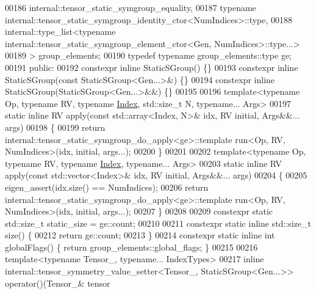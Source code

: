 \begin{DoxyCode}
00186       internal::tensor\_static\_symgroup\_equality,
00187       \textcolor{keyword}{typename} internal::tensor\_static\_symgroup\_identity\_ctor<NumIndices>::type,
00188       internal::type\_list<typename internal::tensor\_static\_symgroup\_element\_ctor<Gen, NumIndices>::type...>
00189     > group\_elements;
00190     \textcolor{keyword}{typedef} \textcolor{keyword}{typename} group\_elements::type ge;
00191   \textcolor{keyword}{public}:
00192     constexpr \textcolor{keyword}{inline} StaticSGroup() \{\}
00193     constexpr \textcolor{keyword}{inline} StaticSGroup(\textcolor{keyword}{const} StaticSGroup<Gen...>&) \{\}
00194     constexpr \textcolor{keyword}{inline} StaticSGroup(StaticSGroup<Gen...>&&) \{\}
00195 
00196     \textcolor{keyword}{template}<\textcolor{keyword}{typename} Op, \textcolor{keyword}{typename} RV, \textcolor{keyword}{typename} \hyperlink{namespace_eigen_a62e77e0933482dafde8fe197d9a2cfde}{Index}, std::size\_t N, \textcolor{keyword}{typename}... Args>
00197     \textcolor{keyword}{static} \textcolor{keyword}{inline} RV apply(\textcolor{keyword}{const} std::array<Index, N>& idx, RV initial, Args&&... args)
00198     \{
00199       \textcolor{keywordflow}{return} internal::tensor\_static\_symgroup\_do\_apply<ge>::template run<Op, RV, NumIndices>(idx, initial, 
      args...);
00200     \}
00201 
00202     \textcolor{keyword}{template}<\textcolor{keyword}{typename} Op, \textcolor{keyword}{typename} RV, \textcolor{keyword}{typename} \hyperlink{namespace_eigen_a62e77e0933482dafde8fe197d9a2cfde}{Index}, \textcolor{keyword}{typename}... Args>
00203     \textcolor{keyword}{static} \textcolor{keyword}{inline} RV apply(\textcolor{keyword}{const} std::vector<Index>& idx, RV initial, Args&&... args)
00204     \{
00205       eigen\_assert(idx.size() == NumIndices);
00206       \textcolor{keywordflow}{return} internal::tensor\_static\_symgroup\_do\_apply<ge>::template run<Op, RV, NumIndices>(idx, initial, 
      args...);
00207     \}
00208 
00209     constexpr \textcolor{keyword}{static} std::size\_t static\_size = ge::count;
00210 
00211     constexpr \textcolor{keyword}{static} \textcolor{keyword}{inline} std::size\_t size() \{
00212       \textcolor{keywordflow}{return} ge::count;
00213     \}
00214     constexpr \textcolor{keyword}{static} \textcolor{keyword}{inline} \textcolor{keywordtype}{int} globalFlags() \{ \textcolor{keywordflow}{return} group\_elements::global\_flags; \}
00215 
00216     \textcolor{keyword}{template}<\textcolor{keyword}{typename} Tensor\_, \textcolor{keyword}{typename}... IndexTypes>
00217     \textcolor{keyword}{inline} internal::tensor\_symmetry\_value\_setter<Tensor\_, StaticSGroup<Gen...>> operator()(Tensor\_& tensor

\end{DoxyCode}
